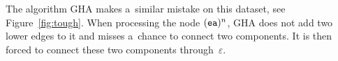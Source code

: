 \documentclass[11pt]{article}
\newenvironment{mypic}{\begin{center}\begin{tikzpicture}[>=latex,line width=.3mm]}{\end{tikzpicture}\end{center}}
\begin{document}
The algorithm GHA makes a~similar mistake on this dataset, see Figure~\ref{fig:tough}. When processing the node $({\tt ea})^n$, GHA does not add two lower edges to it and misses a~chance to connect two components. It is then forced to connect these two components through~$\varepsilon$.

%
%
% 
%
\end{document}
